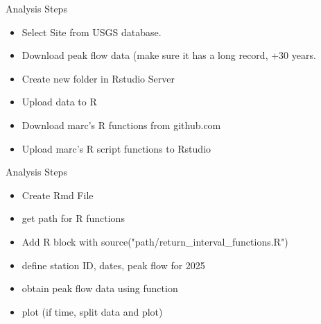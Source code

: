 \documentclass{beamer}
\begin{document}
\begin{frame}{Analysis Steps}
    \begin{itemize}
        \item Select Site from USGS database.
        \item Download peak flow data (make sure it has a long record, +30 years.
        \item Create new folder in Rstudio Server
        \item Upload data to R
        \item Download marc's R functions from github.com
        \item Upload marc's R script functions to Rstudio
    \end{itemize}
\end{frame}


\begin{frame}{Analysis Steps}
    \begin{itemize}
        \item Create Rmd File
        \item get path for R functions
        \item Add R block with source("path/return\_interval\_functions.R")
        \item define station ID, dates, peak flow for 2025
        \item obtain peak flow data using function
        \item plot (if time, split data and plot)
    \end{itemize}
\end{frame}
\end{document}
